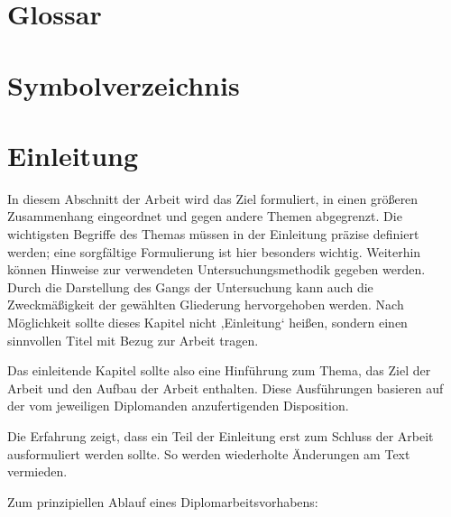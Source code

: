 \documentclass[11pt]{scrartcl}
\begin{document}
\newpage

\tableofcontents
\newpage


\section*{Glossar}             %
\section*{Symbolverzeichnis}   %
\newpage

\listoffigures
{}
\listoftables
{}
\newpage

\onehalfspacing



\section{Einleitung}
In diesem Abschnitt der Arbeit wird das Ziel formuliert, in einen größeren Zusammenhang eingeordnet und gegen andere Themen abgegrenzt. Die wichtigsten Begriffe des Themas müssen in der Einleitung präzise definiert werden; eine sorgfältige Formulierung ist hier besonders wichtig. Weiterhin können Hinweise zur verwendeten Untersuchungsmethodik gegeben werden. Durch die Darstellung des Gangs der Untersuchung kann auch die Zweckmäßigkeit der gewählten Gliederung hervorgehoben werden.  Nach Möglichkeit sollte dieses Kapitel nicht ‚Einleitung‘ heißen, sondern einen sinnvollen Titel mit Bezug zur Arbeit tragen.

Das einleitende Kapitel sollte also eine Hinführung zum Thema, das Ziel der Arbeit und den Aufbau der Arbeit enthalten. Diese Ausführungen basieren auf der vom jeweiligen Diplomanden anzufertigenden Disposition.

Die Erfahrung zeigt, dass ein Teil der Einleitung erst zum Schluss der Arbeit ausformuliert  werden sollte. So werden wiederholte Änderungen am Text vermieden.

Zum prinzipiellen Ablauf eines Diplomarbeitsvorhabens:
\end{document}
